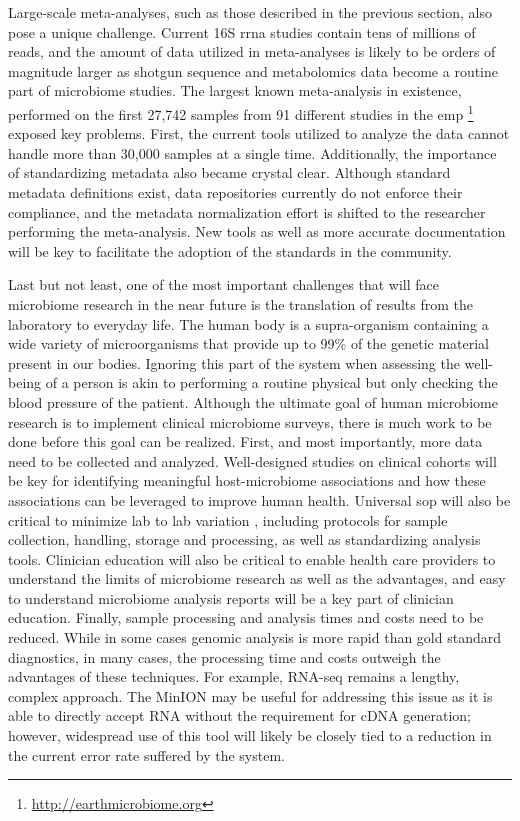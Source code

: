 Large-scale meta-analyses, such as those described in the previous section, also pose a unique challenge. Current 16S \gls{rrna} studies contain tens of millions of reads, and the amount of data utilized in meta-analyses is likely to be orders of magnitude larger as shotgun sequence and metabolomics data become a routine part of microbiome studies. The largest known meta-analysis in existence, performed on the first 27,742 samples from 91 different studies in the \gls{emp} \footnote{\label{empurl}\url{http://earthmicrobiome.org}} exposed key problems. First, the current tools utilized to analyze the data cannot handle more than 30,000 samples at a single time. Additionally, the importance of standardizing metadata also became crystal clear. Although standard metadata definitions exist, data repositories currently do not enforce their compliance, and the metadata normalization effort is shifted to the researcher performing the meta-analysis. New tools as well as more accurate documentation will be key to facilitate the adoption of the standards in the community.

Last but not least, one of the most important challenges that will face microbiome research in the near future is the translation of results from the laboratory to everyday life. The human body is a supra-organism containing a wide variety of microorganisms that provide up to 99\% of the genetic material present in our bodies. Ignoring this part of the system when assessing the well-being of a person is akin to performing a routine physical but only checking the blood pressure of the patient. Although the ultimate goal of human microbiome research is to implement clinical microbiome surveys, there is much work to be done before this goal can be realized. First, and most importantly, more data need to be collected and analyzed. Well-designed studies on clinical cohorts will be key for identifying meaningful host-microbiome associations and how these associations can be leveraged to improve human health. Universal \gls{sop} will also be critical to minimize lab to lab variation \cite{Sinha2015}, including protocols for sample collection, handling, storage and processing, as well as standardizing analysis tools. Clinician education will also be critical to enable health care providers to understand the limits of microbiome research as well as the advantages, and easy to understand microbiome analysis reports will be a key part of clinician education. Finally, sample processing and analysis times and costs need to be reduced. While in some cases genomic analysis is more rapid than gold standard diagnostics, in many cases, the processing time and costs outweigh the advantages of these techniques. For example, RNA-seq remains a lengthy, complex approach. The MinION may be useful for addressing this issue as it is able to directly accept RNA without the requirement for cDNA generation; however, widespread use of this tool will likely be closely tied to a reduction in the current error rate suffered by the system.

